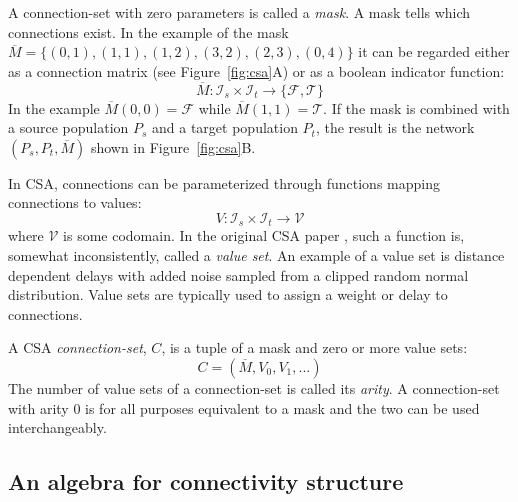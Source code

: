 \documentclass{frontiersSCNS} %
\newcommand{\Figure}[2]{Figure~\ref{#2}}
\newcommand{\Figure}[2]{Figure~#1}
\begin{document}
A connection-set with zero parameters is called a \emph{mask}. A mask
tells which connections exist.  In the example of the mask
$\overline{M} = \{(0,1), (1,1), (1,2), (3,2), (2,3), (0,4)\}$ it can
be regarded either as a connection matrix (see \Figure{1}{fig:csa}A)
or as a boolean indicator function:
\begin{equation}
\overline{M} : \mathcal{I}_s \times \mathcal{I}_t \rightarrow \{ \mathcal{F},
\mathcal{T} \}
\end{equation}
In the example $\overline{M}(0,0) = \mathcal{F}$ while
$\overline{M}(1,1) = \mathcal{T}$. If the mask is combined with a
source population $P_s$ and a target population $P_t$, the result is
the network $(P_s, P_t, \overline{M})$ shown in \Figure{1}{fig:csa}B.

In CSA, connections can be parameterized through functions mapping
connections to values:
\begin{equation}
V : \mathcal{I}_s \times \mathcal{I}_t \rightarrow \mathcal{V}
\end{equation}
where $\mathcal{V}$ is some codomain. In the original CSA paper
\citep{djurfeldt12}, such a function is, somewhat inconsistently,
called a \emph{value set}. An example of a value set is distance
dependent delays with added noise sampled from a clipped random normal
distribution. Value sets are typically used to assign a weight or
delay to connections.

A CSA \emph{connection-set}, $C$, is a tuple of a mask and zero or
more value sets:
\begin{equation}
C = (\overline{M}, V_0, V_1, ...)
\end{equation}
The number of value sets of a connection-set is called its
\emph{arity}. A connection-set with arity 0 is for all purposes
equivalent to a mask and the two can be used interchangeably.

\subsection{An algebra for connectivity structure}\label{sec:structure}
\end{document}
